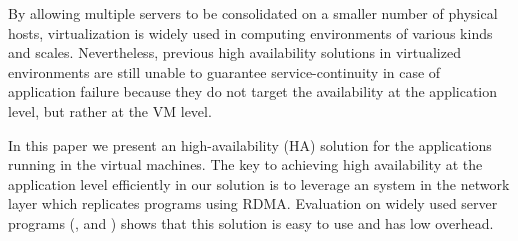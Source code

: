 By allowing multiple servers to be consolidated on a smaller number of physical 
hosts, virtualization is widely used in computing environments of various kinds and
scales. Nevertheless, previous high availability solutions in virtualized environments
are still unable to guarantee service-continuity in case of application failure because 
they do not target the availability at the application level, but rather at the VM level.

In this paper we present an high-availability (HA) solution for the applications running in 
the virtual machines. The key to achieving high availability at the application level efficiently
in our solution is to leverage an \smr system in the network layer which replicates programs 
using RDMA. Evaluation on \nprog widely used server programs (\eg, \mysql and \redis) shows that this 
solution is easy to use and has low overhead.
